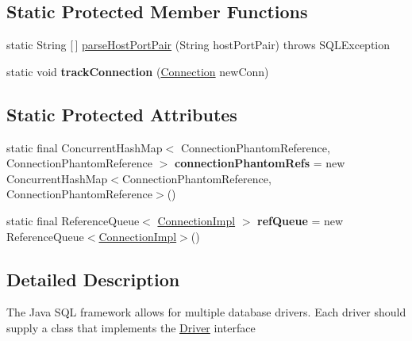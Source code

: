 \subsection*{Static Protected Member Functions}
\begin{DoxyCompactItemize}
\item 
static String \mbox{[}$\,$\mbox{]} \mbox{\hyperlink{classcom_1_1mysql_1_1jdbc_1_1_non_registering_driver_ac7360814a69eb287dc4c0b5f7ca06cbf}{parse\+Host\+Port\+Pair}} (String host\+Port\+Pair)  throws S\+Q\+L\+Exception 
\item 
\mbox{\label{classcom_1_1mysql_1_1jdbc_1_1_non_registering_driver_a7070cbf8e9dcf7da7897adfdecdd13f5}} 
static void {\bfseries track\+Connection} (\mbox{\hyperlink{interfacecom_1_1mysql_1_1jdbc_1_1_connection}{Connection}} new\+Conn)
\end{DoxyCompactItemize}
\subsection*{Static Protected Attributes}
\begin{DoxyCompactItemize}
\item 
\mbox{\label{classcom_1_1mysql_1_1jdbc_1_1_non_registering_driver_ac1b78a14fefae8982799d10939bdb000}} 
static final Concurrent\+Hash\+Map$<$ Connection\+Phantom\+Reference, Connection\+Phantom\+Reference $>$ {\bfseries connection\+Phantom\+Refs} = new Concurrent\+Hash\+Map$<$Connection\+Phantom\+Reference, Connection\+Phantom\+Reference$>$()
\item 
\mbox{\label{classcom_1_1mysql_1_1jdbc_1_1_non_registering_driver_ae9903f531d16c36242f70857424df23b}} 
static final Reference\+Queue$<$ \mbox{\hyperlink{classcom_1_1mysql_1_1jdbc_1_1_connection_impl}{Connection\+Impl}} $>$ {\bfseries ref\+Queue} = new Reference\+Queue$<$\mbox{\hyperlink{classcom_1_1mysql_1_1jdbc_1_1_connection_impl}{Connection\+Impl}}$>$()
\end{DoxyCompactItemize}


\subsection{Detailed Description}
The Java S\+QL framework allows for multiple database drivers. Each driver should supply a class that implements the \mbox{\hyperlink{classcom_1_1mysql_1_1jdbc_1_1_driver}{Driver}} interface

